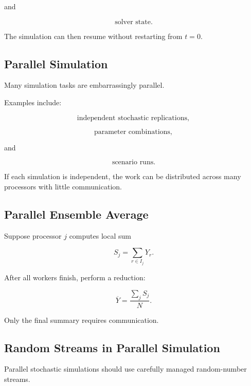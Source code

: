and

\[
\boxed{
\text{solver state}.
}
\]

The simulation can then resume without restarting from \(t=0\).

\subsection{Parallel Simulation}
\label{subsec:parallel-simulation}

Many simulation tasks are embarrassingly parallel.

Examples include:

\[
\boxed{
\text{independent stochastic replications},
}
\]

\[
\boxed{
\text{parameter combinations},
}
\]

and

\[
\boxed{
\text{scenario runs}.
}
\]

If each simulation is independent, the work can be distributed across many
processors with little communication.

\subsection{Parallel Ensemble Average}
\label{subsec:parallel-ensemble-average}

Suppose processor \(j\) computes local sum

\[
\boxed{
S_j
=
\sum_{r\in I_j}
Y_r.
}
\]

After all workers finish, perform a reduction:

\[
\boxed{
\overline{Y}
=
\frac{
\sum_jS_j
}{
N
}.
}
\]

Only the final summary requires communication.

\subsection{Random Streams in Parallel Simulation}
\label{subsec:parallel-simulation-random-streams}

Parallel stochastic simulations should use carefully managed random-number
streams.

